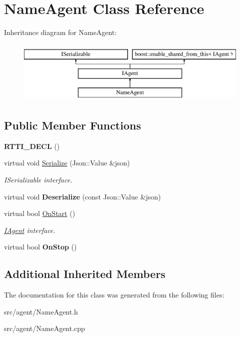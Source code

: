 \hypertarget{class_name_agent}{}\section{Name\+Agent Class Reference}
\label{class_name_agent}
Inheritance diagram for Name\+Agent\+:\begin{figure}[H]
\begin{center}
\leavevmode
\includegraphics[height=3.000000cm]{class_name_agent}
\end{center}
\end{figure}
\subsection*{Public Member Functions}
\begin{DoxyCompactItemize}
\item 
\mbox{\label{class_name_agent_a1d3213a301070aac400c46cb88b46de5}} 
{\bfseries R\+T\+T\+I\+\_\+\+D\+E\+CL} ()
\item 
\mbox{\label{class_name_agent_a7308edf26873a6a8ecc02814c363d852}} 
virtual void \hyperlink{class_name_agent_a7308edf26873a6a8ecc02814c363d852}{Serialize} (Json\+::\+Value \&json)
\begin{DoxyCompactList}\small\item\em I\+Serializable interface. \end{DoxyCompactList}\item 
\mbox{\label{class_name_agent_a08931841f8753bb49fd8fc53f0908ebc}} 
virtual void {\bfseries Deserialize} (const Json\+::\+Value \&json)
\item 
\mbox{\label{class_name_agent_ae3c5f85cf4fd090bda58d859e0714e28}} 
virtual bool \hyperlink{class_name_agent_ae3c5f85cf4fd090bda58d859e0714e28}{On\+Start} ()
\begin{DoxyCompactList}\small\item\em \hyperlink{class_i_agent}{I\+Agent} interface. \end{DoxyCompactList}\item 
\mbox{\label{class_name_agent_a616387b0a9d73770f0fd5a9bca788540}} 
virtual bool {\bfseries On\+Stop} ()
\end{DoxyCompactItemize}
\subsection*{Additional Inherited Members}


The documentation for this class was generated from the following files\+:\begin{DoxyCompactItemize}
\item 
src/agent/Name\+Agent.\+h\item 
src/agent/Name\+Agent.\+cpp\end{DoxyCompactItemize}
